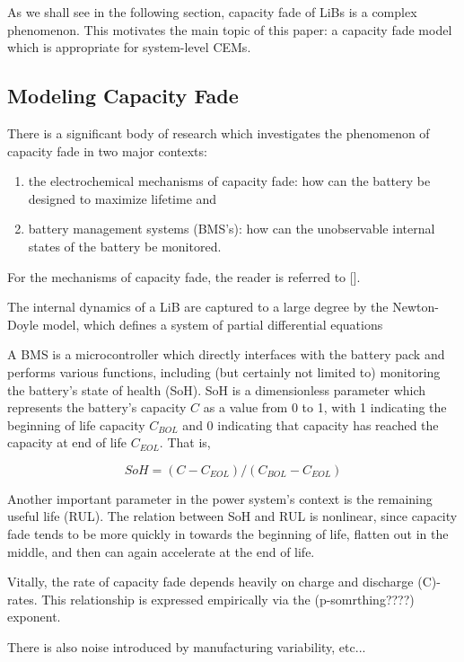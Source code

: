 As we shall see in the following section, capacity fade of LiBs is a complex phenomenon. This motivates the main topic of this paper: a capacity fade model which is appropriate for system-level CEMs.

\subsection{Modeling Capacity Fade}

There is a significant body of research which investigates the phenomenon of capacity fade in two major contexts:
\begin{enumerate}
\item the electrochemical mechanisms of capacity fade: how can the battery be designed to maximize lifetime and
\item battery management systems (BMS's): how can the unobservable internal states of the battery be monitored.
\end{enumerate}

For the mechanisms of capacity fade, the reader is referred to [].

The internal dynamics of a LiB are captured to a large degree by the Newton-Doyle model, which defines a system of partial differential equations 

A BMS is a microcontroller which directly interfaces with the battery pack and performs various functions, including (but certainly not limited to)
monitoring the battery's state of health (SoH). SoH is a dimensionless parameter which represents the battery's capacity $C$ as a value from 0 to 1,
with 1 indicating the beginning of life capacity $C_{BOL}$ and 0 indicating that capacity has reached the capacity at end of life $C_{EOL}$. That is,

\begin{equation}
    SoH = (C - C_{EOL})/(C_{BOL} - C_{EOL})
\end{equation}

Another important parameter in the power system's context is the remaining useful life (RUL).
The relation between SoH and RUL is nonlinear, since capacity fade tends to be more quickly in towards the beginning of life,
flatten out in the middle, and then can again accelerate at the end of life.

Vitally, the rate of capacity fade depends heavily on charge and discharge (C)-rates.
This relationship is expressed empirically via the (p-somrthing????) exponent.

There is also noise introduced by manufacturing variability, etc...

